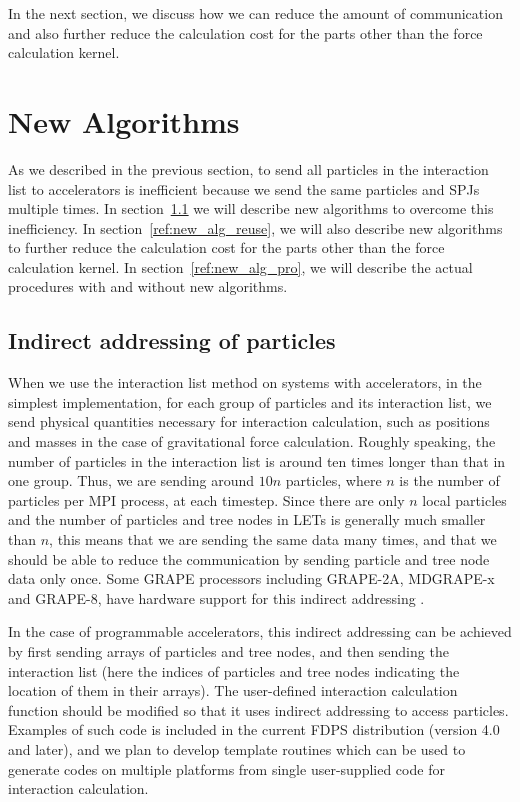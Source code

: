 \documentclass[dvipdfmx]{pasj01}
\begin{document}
In the next section, we discuss how we can reduce the amount of
communication and also further reduce the calculation cost for the
parts other than the force calculation kernel.

\section{New Algorithms}
\label{ref:new_alg}

As we described in the previous section, to send all particles in the
interaction list to accelerators is inefficient because we send the
same particles and SPJs multiple times. In
section~\ref{ref:new_alg_id} we will describe new algorithms to
overcome this inefficiency. In section~\ref{ref:new_alg_reuse}, we
will also describe new algorithms to further reduce the calculation
cost for the parts other than the force calculation kernel. In
section~\ref{ref:new_alg_pro}, we will describe the actual procedures
with and without new algorithms.

\subsection{Indirect addressing of particles}
\label{ref:new_alg_id}

When we use the interaction list method on systems with accelerators,
in the simplest implementation, for each group of particles and its
interaction list, we send physical quantities necessary for
interaction calculation, such as positions and masses in the case of
gravitational force calculation. Roughly speaking, the number of
particles in the interaction list is around ten times longer than that
in one group. Thus, we are sending around $10n$ particles, where $n$
is the number of particles per MPI process, at each timestep.  Since
there are only $n$ local particles and the number of particles and
tree nodes in LETs is generally much smaller than $n$, this means that
we are sending the same data many times, and that we should be able to
reduce the communication by sending particle and tree node data only
once. Some GRAPE processors including GRAPE-2A, MDGRAPE-x and GRAPE-8,
have hardware support for this indirect addressing \citep{makino2012}.

In the case of programmable accelerators, this indirect addressing can
be achieved by first sending arrays of particles and tree nodes, and
then sending the interaction list (here the indices of particles and
tree nodes indicating the location of them in their arrays). The
user-defined interaction calculation function should be modified so
that it uses indirect addressing to access particles. Examples of such
code is included in the current FDPS distribution (version 4.0 and
later), and we plan to develop template routines which can be used to
generate codes on multiple platforms from single user-supplied code
for interaction calculation.
\end{document}

